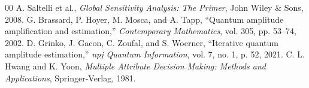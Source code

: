 \documentclass[journal]{IEEEtran}
\begin{document}
\begin{thebibliography}{00}
 A. Saltelli et al., \emph{Global Sensitivity Analysis: The Primer}, John Wiley \& Sons, 2008.
 G. Brassard, P. Hoyer, M. Mosca, and A. Tapp, ``Quantum amplitude amplification and estimation,'' \emph{Contemporary Mathematics}, vol. 305, pp. 53--74, 2002.
 D. Grinko, J. Gacon, C. Zoufal, and S. Woerner, ``Iterative quantum amplitude estimation,'' \emph{npj Quantum Information}, vol. 7, no. 1, p. 52, 2021.
 C. L. Hwang and K. Yoon, \emph{Multiple Attribute Decision Making: Methods and Applications}, Springer-Verlag, 1981.
\end{thebibliography}
\end{document}
